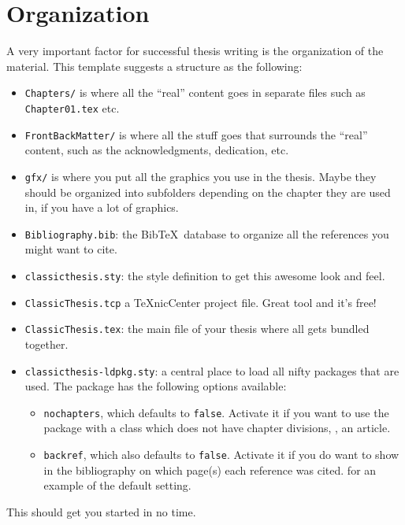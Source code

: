 \section{Organization}
A very important factor for successful thesis writing is the
organization of the material. This template suggests a structure as
the following:
\begin{itemize}
    \item\texttt{Chapters/} is where all the ``real'' content goes in
    separate files such as \texttt{Chapter01.tex} etc.
    \item\texttt{FrontBackMatter/} is where all the stuff goes that
    surrounds the ``real'' content, such as the acknowledgments,
    dedication, etc.
    \item\texttt{gfx/} is where you put all the graphics you use in
    the thesis. Maybe they should be organized into subfolders
    depending on the chapter they are used in, if you have a lot of
    graphics.
    \item\texttt{Bibliography.bib}: the Bib\TeX\ database to organize
    all the references you might want to cite.
    \item\texttt{classicthesis.sty}: the style definition to get this
    awesome look and feel. 
    \item\texttt{ClassicThesis.tcp} a \TeX nicCenter project file.
    Great tool and it's free!
    \item\texttt{ClassicThesis.tex}: the main file of your thesis
    where all gets bundled together.
    \item\texttt{classicthesis-ldpkg.sty}: a central place to load all 
    nifty packages that are used. The package has the following options 
    available:
		\begin{itemize}
			\item\texttt{nochapters}, which defaults to \texttt{false}.
		    Activate it if you want to use the package with a class which does
		    not have chapter divisions, \eg, an article.
		    \item\texttt{backref}, which also defaults to \texttt{false}.
		    Activate it if you do want to show in the bibliography on which
		    page(s) each reference was cited. %
		    for an example of the default setting.
		\end{itemize}
\end{itemize}
This should get you started in no time.


